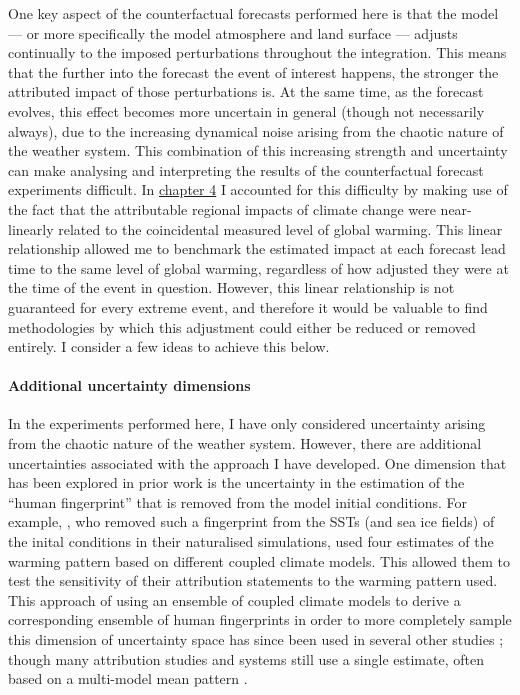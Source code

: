     One key aspect of the counterfactual forecasts performed here is that the model --- or more specifically the model atmosphere and land surface --- adjusts continually to the imposed perturbations throughout the integration. This means that the further into the forecast the event of interest happens, the stronger the attributed impact of those perturbations is. At the same time, as the forecast evolves, this effect becomes more uncertain in general (though not necessarily always), due to the increasing dynamical noise arising from the chaotic nature of the weather system. This combination of this increasing strength and uncertainty can make analysing and interpreting the results of the counterfactual forecast experiments difficult. In \hyperref[ch4]{chapter 4} I accounted for this difficulty by making use of the fact that the attributable regional impacts of climate change were near-linearly related to the coincidental measured level of global warming. This linear relationship allowed me to benchmark the estimated impact at each forecast lead time to the same level of global warming, regardless of how adjusted they were at the time of the event in question. However, this linear relationship is not guaranteed for every extreme event, and therefore it would be valuable to find methodologies by which this adjustment could either be reduced or removed entirely. I consider a few ideas to achieve this below.

  \paragraph*{Additional uncertainty dimensions}

    In the experiments performed here, I have only considered uncertainty arising from the chaotic nature of the weather system. However, there are additional uncertainties associated with the approach I have developed. One dimension that has been explored in prior work is the uncertainty in the estimation of the ``human fingerprint'' that is removed from the model initial conditions. For example, \citet{pall_anthropogenic_2011}, who removed such a fingerprint from the SSTs (and sea ice fields) of the inital conditions in their naturalised simulations, used four estimates of the warming pattern based on different coupled climate models. This allowed them to test the sensitivity of their attribution statements to the warming pattern used. This approach of using an ensemble of coupled climate models to derive a corresponding ensemble of human fingerprints in order to more completely sample this dimension of uncertainty space has since been used in several other studies \citep{schaller_human_2016}; though many attribution studies and systems still use a single estimate, often based on a multi-model mean pattern \citep{ciavarella_upgrade_2018,stone_benchmark_2021}. 

